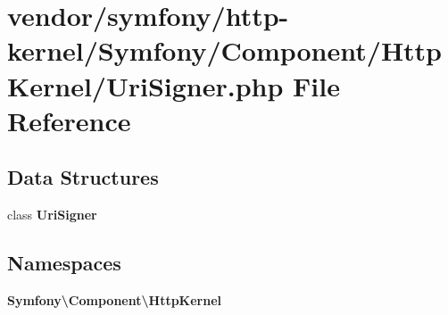 \section{vendor/symfony/http-\/kernel/\+Symfony/\+Component/\+Http\+Kernel/\+Uri\+Signer.php File Reference}
\label{_uri_signer_8php}
\subsection*{Data Structures}
\begin{DoxyCompactItemize}
\item 
class {\bf Uri\+Signer}
\end{DoxyCompactItemize}
\subsection*{Namespaces}
\begin{DoxyCompactItemize}
\item 
 {\bf Symfony\textbackslash{}\+Component\textbackslash{}\+Http\+Kernel}
\end{DoxyCompactItemize}
